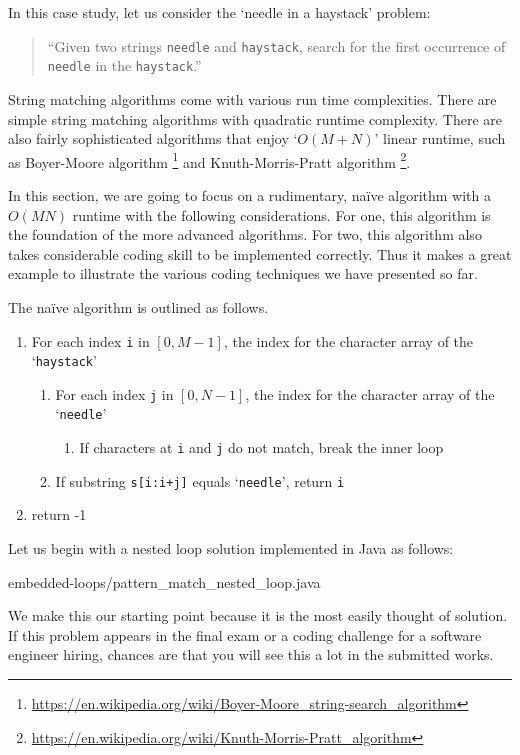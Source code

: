 \documentclass[oneside,11pt]{book}
\theoremstyle{definition}
\theoremstyle{remark}
\newcommand{\code}[1]{\mbox{\lstinline{#1}}}
\newcommand{\java}{Java }
\begin{document}
In this case study, let us consider the `needle in a haystack' problem:
\begin{quote}
``Given two strings \code{needle} and \code{haystack}, search for the first occurrence of
\code{needle} in the \code{haystack}.''
\end{quote}
String matching algorithms come with various run time complexities.
There are simple string matching algorithms with quadratic runtime complexity.
There are also fairly sophisticated algorithms that enjoy `$O(M + N)$' linear runtime,
such as Boyer-Moore algorithm
\footnote{\url{https://en.wikipedia.org/wiki/Boyer-Moore_string-search_algorithm}} and
Knuth-Morris-Pratt algorithm
\footnote{\url{https://en.wikipedia.org/wiki/Knuth-Morris-Pratt_algorithm}}.


In this section, we are going to focus on
a rudimentary, naïve algorithm with a $O(MN)$ runtime with the following considerations.
For one, this algorithm is the foundation of the more advanced algorithms.
For two, this algorithm also takes considerable coding skill to be implemented correctly.
Thus it makes a great example to illustrate
the various coding techniques we have presented so far.


The naïve algorithm is outlined as follows.
\begin{alisting}
\caption{\label{alg:string-search-naive-algorithm}
A naïve algorithm for string search whose runtime complexity is $O(MN)$ where $M$ and $N$ are
the string lengths.}
\begin{enumerate}
\item For each index \code{i} in $[0, M-1]$, the index for the character array of
the `\code{haystack}'
\begin{enumerate}
\item For each index \code{j} in $[0, N-1]$, the index for the
character array of the `\code{needle}'
\begin{enumerate}
\item If characters at \code{i} and \code{j} do not match, break the inner loop
\end{enumerate}
\item If substring \code{s[i:i+j]} equals `\code{needle}', return \code{i}
\end{enumerate}
\item return -1
\end{enumerate}
\end{alisting}


Let us begin with a nested loop solution implemented in \java as follows:
\begin{clisting}

{embedded-loops/pattern_match_nested_loop.java}
\end{clisting}
We make this our starting point because it is the most easily thought of solution.
If this problem appears in the final exam or a coding challenge for a software engineer hiring,
chances are that you will see this a lot in the submitted works.
\end{document}
